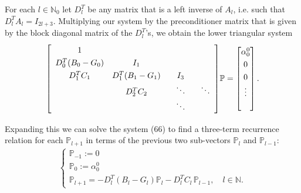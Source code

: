 \documentclass[11pt, oneside]{article}   	%
\newcommand{\N}{\mathbb{N}}
\newcommand{\No}{\mathbb{N}_0}
\newcommand{\bigP}{\mathbb{P}}
\newcommand{\Pl}{\mathbb{P}_l}
\newcommand{\Dlt}{D^T_l}
\begin{document}
For each \(l \in \No\) let \(\Dlt\) be any matrix that is a left inverse of \(A_l\), i.e. such that \(\Dlt A_l = I_{2l+3}\). Multiplying our system by the preconditioner matrix that is given by the block diagonal matrix of the \(\Dlt\)'s, we obtain the lower triangular system
\begin{align}
\renewcommand\arraystretch{1.3}
\mleft[
\begin{array}{cccc}
		1  & & & \\
		D^T_0(B_0-G_0) & I_1 & & \\
		D^T_1 C_1 & D^T_1(B_1-G_1) & \quad I_3 \quad & \\
		& D^T_2 C_2 & \ddots & \ddots \\
		& & \ddots &
\end{array}
\mright]
\bigP
=
\begin{bmatrix}
	\alpha^0_0 \\ 0 \\ 0 \\ \vdots \\ \\
\end{bmatrix}.
\end{align}

Expanding this we can solve the system (66) to find a three-term recurrence relation for each \(\bigP_{l+1}\) in terms of the previous two sub-vectors \(\Pl\) and \(\bigP_{l-1}\):
\begin{align}
\begin{cases}
\bigP_{-1} := 0 \\
\bigP_{0} := \alpha^0_0 \\
\bigP_{l+1} = -\Dlt (B_l-G_l) \Pl - \Dlt C_l  \,\bigP_{l-1}, \quad l \in \N.
\end{cases}
\end{align}
\end{document}
